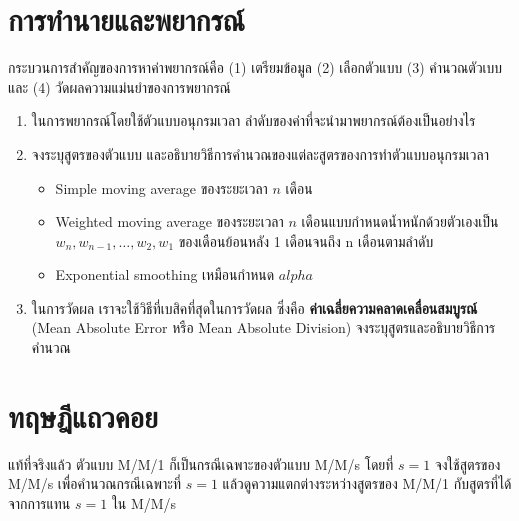 \section*{การทำนายและพยากรณ์}
กระบวนการสำคัญของการหาค่าพยากรณ์คือ (1) เตรียมข้อมูล (2) เลือกตัวแบบ (3) คำนวณตัวเบบ และ (4) วัดผลความแม่นยำของการพยากรณ์
\begin{enumerate}
	\item ในการพยากรณ์โดยใช้ตัวแบบอนุกรมเวลา ลำดับของค่าที่จะนำมาพยากรณ์ต้องเป็นอย่างไร
	\item จงระบุสูตรของตัวแบบ และอธิบายวิธีการคำนวณของแต่ละสูตรของการทำตัวแบบอนุกรมเวลา
	\begin{itemize}
		\item Simple moving average ของระยะเวลา $n$ เดือน
		\item Weighted moving average ของระยะเวลา $n$ เดือนแบบกำหนดน้ำหนักด้วยตัวเองเป็น $w_n, w_{n-1}, \dots, w_2, w_1$ ของเดือนย้อนหลัง 1 เดือนจนถึง n เดือนตามลำดับ
		\item Exponential smoothing เหมือนกำหนด $alpha$
	\end{itemize}
	\item ในการวัดผล เราจะใช้วิธีที่เบสิคที่สุดในการวัดผล ซึ่งคือ \textbf{ค่าเฉลี่ยความคลาดเคลื่อนสมบูรณ์} (Mean Absolute Error หรือ Mean Absolute Division) จงระบุสูตรและอธิบายวิธีการคำนวณ 
\end{enumerate}


\section*{ทฤษฎีแถวคอย}
แท้ที่จริงแล้ว ตัวแบบ M/M/1 ก็เป็นกรณีเฉพาะของตัวแบบ M/M/s โดยที่ $s=1$ จงใช้สูตรของ M/M/s เพื่อคำนวณกรณีเฉพาะที่ $s=1$ แล้วดูความแตกต่างระหว่างสูตรของ M/M/1 กับสูตรที่ได้จากการแทน $s=1$ ใน M/M/s


